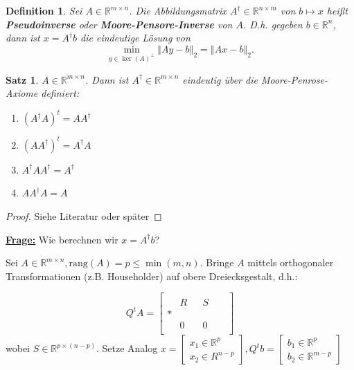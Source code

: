 \documentclass{book}
\newtheorem{theorem}[algorithm]{Satz}
\newtheorem{definition}[algorithm]{Definition}
\def\R{\mathbb{R}}
\def\rang{\text{rang}}
\begin{document}
            \begin{definition}\label{d2.22}
                Sei $A\in\R^{m\times n}$. Die Abbildungsmatrix $A^\dagger\in\R^{n\times m}$ von $b\mapsto x$ heißt 
                \textbf{Pseudoinverse} oder \textbf{Moore-Pensore-Inverse} von $A$. D.h. gegeben $b\in\R^n$, dann ist $x=A^\dagger b$ die eindeutige Lösung von 
                \[
                    \min_{y\in\ker(A)^\perp} \left\Vert Ay-b \right\Vert_2 = \left\Vert Ax-b \right\Vert_2.    
                \]
            \end{definition}
            
            \begin{theorem}\label{s2.23}
                $A\in\R^{m\times n}$. Dann ist $A^\dagger\in\R^{m\times n}$ eindeutig über die Moore-Penrose-Axiome definiert:
                \begin{enumerate}
                    \item $(A^\dagger A)^t=AA^\dagger$
                    \item $(AA^\dagger )^t=A^\dagger A$
                    \item $A^\dagger AA^\dagger = A^\dagger$
                    \item $AA^\dagger A=A$
                \end{enumerate}
            \end{theorem}

            \begin{proof}
                Siehe Literatur oder später
            \end{proof}

            \underline{\textbf{Frage:}} Wie berechnen wir $x=A^\dagger b$?

            Sei $A\in\R^{m\times n},\rang(A)=p\leq \min(m,n)$. Bringe $A$ mittels orthogonaler Transformationen (z.B. Householder) auf 
            obere Dreiecksgestalt, d.h.:

            \begin{equation}\label{g2.6}
                Q^tA=\begin{bmatrix}
                    &  &  & & & \\
                    & R & & S & & \\
                    * & & & & &\\
                    & 0 & &  0 & & \\ 
                \end{bmatrix}
            \end{equation}
            wobei  $S\in \R^{p\times (n-p)}$.
            Setze Analog $x=\begin{bmatrix}
                x_1\in\R^p\\
                x_2\in R^{n-p}
            \end{bmatrix},Q^t b=\begin{bmatrix}
                b_1\in\R^p\\
                b_2\in \R^{m-p}
            \end{bmatrix}$
\end{document}
